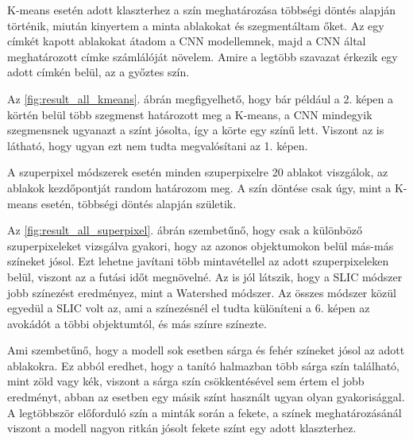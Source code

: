 K-means esetén adott klaszterhez a szín meghatározása többségi döntés alapján történik, miután kinyertem a minta ablakokat és szegmentáltam őket. Az egy címkét kapott ablakokat átadom a CNN modellemnek, majd a CNN által meghatározott címke számlálóját növelem. Amire a legtöbb szavazat érkezik egy adott címkén belül, az a győztes szín.

Az \ref{fig:result_all_kmeans}. ábrán megfigyelhető, hogy bár például a 2. képen a körtén belül több szegmenst határozott meg a K-means, a CNN mindegyik szegmensnek ugyanazt a színt jósolta, így a körte egy színű lett. Viszont az is látható, hogy ugyan ezt nem tudta megvalósítani az 1. képen.

A szuperpixel módszerek esetén minden szuperpixelre 20 ablakot viszgálok, az ablakok kezdőpontját random határozom meg. A szín döntése csak úgy, mint a K-means esetén, többségi döntés alapján születik. 

Az \ref{fig:result_all_superpixel}. ábrán szembetűnő, hogy csak a különböző szuperpixeleket vizsgálva gyakori, hogy az azonos objektumokon belül más-más színeket jósol. Ezt lehetne javítani több mintavétellel az adott szuperpixeleken belül, viszont az a futási időt megnövelné. Az is jól látszik, hogy a SLIC módszer jobb színezést eredményez, mint a Watershed módszer. Az összes módszer közül egyedül a SLIC volt az, ami a színezésnél el tudta különíteni a 6. képen az avokádót a többi objektumtól, és más színre színezte.

Ami szembetűnő, hogy a modell sok esetben sárga és fehér színeket jósol az adott ablakokra. Ez abból eredhet, hogy a tanító halmazban több sárga szín található, mint zöld vagy kék, viszont a sárga szín csökkentésével sem értem el jobb eredményt, abban az esetben egy másik színt használt ugyan olyan gyakorisággal. A legtöbbször előforduló szín a minták során a fekete, a színek meghatározásánál viszont a modell nagyon ritkán jósolt fekete színt egy adott klaszterhez. 

